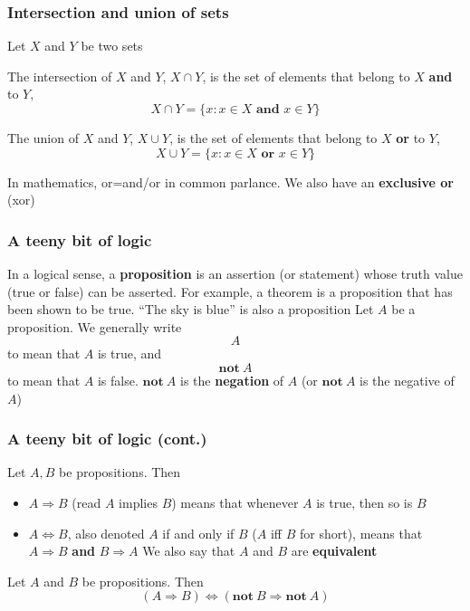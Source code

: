 \documentclass[aspectratio=169]{beamer}\usepackage[]{graphicx}\usepackage[]{xcolor}
\begin{document}
\begin{frame}
\frametitle{Intersection and union of sets}
	Let $X$ and $Y$ be two sets
	\vfill
	\begin{definition}[Intersection]
		The intersection of $X$ and $Y$, $X\cap Y$, is the set of elements that belong
		to $X$ \textbf{and} to $Y$,
		\[
		X\cap Y=\{x:x\in X\textbf{ and } x\in Y\}
		\]
	\end{definition}
	\vfill
	\begin{definition}[Union]
		The union of $X$ and $Y$, $X\cup Y$, is the set of elements that belong
		to $X$ \textbf{or} to $Y$,
		\[
		X\cup Y=\{x:x\in X\textbf{ or } x\in Y\}
		\]
	\end{definition}
In mathematics, or=and/or in common parlance. We also have an \textbf{exclusive or} (xor)
\end{frame}

\begin{frame}
\frametitle{A teeny bit of logic}
	In a logical sense, a \textbf{proposition} is an assertion (or statement)
	whose truth value (true or false) can be asserted. For example, a theorem is a
	proposition that has been shown to be true. ``The sky is blue'' is also a
	proposition
	\vfill
	Let $A$ be a proposition. We generally write
	\[
	A
	\]
	to mean that $A$ is true, and 
	\[
	\mathbf{not}\ A
	\]
	to mean that $A$ is false.
	$\mathbf{not}\ A$ is the \textbf{negation} of $A$ (or $\mathbf{not}\ A$
	is the negative of $A$)
\end{frame}

\begin{frame}
\frametitle{A teeny bit of logic (cont.)}
	Let $A,B$ be propositions. Then
	\begin{itemize}
		\item $A\Rightarrow B$ (read $A$ implies $B$) means that whenever $A$ is true,
		then so is $B$
		\item $A\Leftrightarrow B$, also denoted $A$ if and only if $B$ ($A$
		iff $B$ for short), means that $A\Rightarrow B$ \textbf{and} $B\Rightarrow A$\newline
		We also say that $A$ and $B$ are \textbf{equivalent}
	\end{itemize}
	\vfill
	Let $A$ and $B$ be propositions. Then
	\[
	(A\Rightarrow B)\Leftrightarrow(\mathbf{not}\ B\Rightarrow\mathbf{not}\ A)
	\]
\end{frame}
\end{document}
